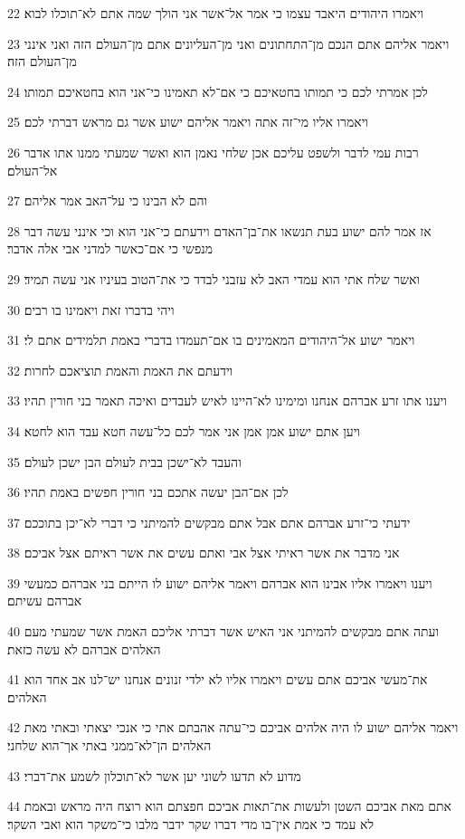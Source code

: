 \par 22 ויאמרו היהודים היאבד עצמו כי אמר אל־אשר אני הולך שמה אתם לא־תוכלו לבוא׃
\par 23 ויאמר אליהם אתם הנכם מן־התחתונים ואני מן־העליונים אתם מן־העולם הזה ואני אינני מן־העולם הזה׃
\par 24 לכן אמרתי לכם כי תמותו בחטאיכם כי אם־לא תאמינו כי־אני הוא בחטאיכם תמותו׃
\par 25 ויאמרו אליו מי־זה אתה ויאמר אליהם ישוע אשר גם מראש דברתי לכם׃
\par 26 רבות עמי לדבר ולשפט עליכם אכן שלחי נאמן הוא ואשר שמעתי ממנו אתו אדבר אל־העולם׃
\par 27 והם לא הבינו כי על־האב אמר אליהם׃
\par 28 אז אמר להם ישוע בעת תנשאו את־בן־האדם וידעתם כי־אני הוא וכי אינני עשה דבר מנפשי כי אם־כאשר למדני אבי אלה אדבר׃
\par 29 ואשר שלח אתי הוא עמדי האב לא עזבני לבדד כי את־הטוב בעיניו אני עשה תמיד׃
\par 30 ויהי בדברו זאת ויאמינו בו רבים׃
\par 31 ויאמר ישוע אל־היהודים המאמינים בו אם־תעמדו בדברי באמת תלמידים אתם לי׃
\par 32 וידעתם את האמת והאמת תוציאכם לחרות׃
\par 33 ויענו אתו זרע אברהם אנחנו ומימינו לא־היינו לאיש לעבדים ואיכה תאמר בני חורין תהיו׃
\par 34 ויען אתם ישוע אמן אמן אני אמר לכם כל־עשה חטא עבד הוא לחטא׃
\par 35 והעבד לא־ישכן בבית לעולם הבן ישכן לעולם׃
\par 36 לכן אם־הבן יעשה אתכם בני חורין חפשים באמת תהיו׃
\par 37 ידעתי כי־זרע אברהם אתם אבל אתם מבקשים להמיתני כי דברי לא־יכן בתוככם׃
\par 38 אני מדבר את אשר ראיתי אצל אבי ואתם עשים את אשר ראיתם אצל אביכם׃
\par 39 ויענו ויאמרו אליו אבינו הוא אברהם ויאמר אליהם ישוע לו הייתם בני אברהם כמעשי אברהם עשיתם׃
\par 40 ועתה אתם מבקשים להמיתני אני האיש אשר דברתי אליכם האמת אשר שמעתי מעם האלהים אברהם לא עשה כזאת׃
\par 41 את־מעשי אביכם אתם עשים ויאמרו אליו לא ילדי זנונים אנחנו יש־לנו אב אחד הוא האלהים׃
\par 42 ויאמר אליהם ישוע לו היה אלהים אביכם כי־עתה אהבתם אתי כי אנכי יצאתי ובאתי מאת האלהים הן־לא־ממני באתי אך־הוא שלחני׃
\par 43 מדוע לא תדעו לשוני יען אשר לא־תוכלון לשמע את־דברי׃
\par 44 אתם מאת אביכם השטן ולעשות את־תאות אביכם חפצתם הוא רוצח היה מראש ובאמת לא עמד כי אמת אין־בו מדי דברו שקר ידבר מלבו כי־משקר הוא ואבי השקר׃
